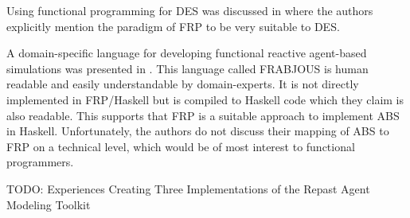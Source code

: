 Using functional programming for DES was discussed in \cite{jankovic_functional_2007} where the authors explicitly mention the paradigm of FRP to be very suitable to DES.

A domain-specific language for developing functional reactive agent-based simulations was presented in \cite{schneider_towards_2012, vendrov_frabjous:_2014}. This language called FRABJOUS is human readable and easily understandable by domain-experts. It is not directly implemented in FRP/Haskell but is compiled to Haskell code which they claim is also readable. This supports that FRP is a suitable approach to implement ABS in Haskell. Unfortunately, the authors do not discuss their mapping of ABS to FRP on a technical level, which would be of most interest to functional programmers.

TODO: Experiences Creating Three Implementations of the Repast Agent Modeling Toolkit \cite{north_experiences_2006}